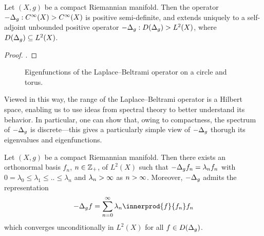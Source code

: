 \documentclass[11pt]{book}
\begin{document}
\begin{result}
Let $(X,g)$ be a compact Riemannian manifold.
Then the operator $-\Delta_g : C^\infty(X) \-> C^\infty(X)$ is positive semi-definite, and extends uniquely to a self-adjoint unbounded positive operator $-\Delta_g: D(\Delta_g) \-> L^2(X)$, where $D(\Delta_g) \subseteq L^2(X)$.
\end{result}

\begin{proof}
\textcite[Theorem 2.4]{strichartz83}.
\end{proof}

\begin{figure}
\begin{subfigure}{0.19\textwidth}

\end{subfigure}
\begin{subfigure}{0.19\textwidth}

\end{subfigure}
\begin{subfigure}{0.59\textwidth}
\tikzset{external/export next=false}
\end{subfigure}
\caption[Laplace--Beltrami eigenfunctions: circle and torus]{Eigenfunctions of the Laplace--Beltrami operator on a circle and torus.}
\label{fig:eig-s1-t2}
\end{figure}

Viewed in this way, the range of the Laplace--Beltrami operator is a Hilbert space, enabling us to use ideas from spectral theory to better understand its behavior.
In particular, one can show that, owing to compactness, the spectrum of $-\Delta_g$ is discrete---this gives a particularly simple view of $-\Delta_g$ thorugh its eigenvalues and eigenfunctions.

\begin{result}
Let $(X,g)$ be a compact Riemannian manifold.
Then there exists an orthonormal basis $f_n$, $n\in\mathbb{Z}_+$, of $L^2(X)$ such that $-\Delta_g f_n = \lambda_n f_n$ with $0 = \lambda_0 \leq \lambda_1 \leq .. \leq \lambda_n$ and $\lambda_n\-> \infty$ as $n\->\infty$.
Moreover, $-\Delta_g$ admits the representation
\[
-\lap_g f = \sum_{n=0}^\infty \lambda_n \innerprod{f}{f_n} f_n
\]
which converges unconditionally in $L^2(X)$ for all $f \in D(\Delta_g)$.
\end{result}
\end{document}
